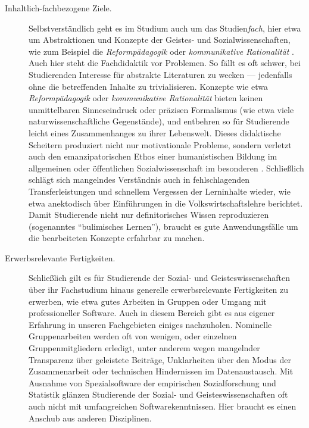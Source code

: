 \documentclass[11pt,a4paper,oneside]{article}
\begin{document}
\begin{description}
	\item[Inhaltlich-fachbezogene Ziele.]
		Selbstverständlich geht es im Studium auch um das Studien\emph{fach}, hier etwa um Abstraktionen und Konzepte der Geistes- und Sozialwissenschaften, wie zum Beispiel die \emph{Reformpädagogik} \cite{Freinet1979}
		oder \emph{kommunikative Rationalität} \cite{Habermas1988a}.
		Auch hier steht die Fachdidaktik vor Problemen.
		So fällt es oft schwer, bei Studierenden Interesse für abstrakte Literaturen zu wecken --- jedenfalls ohne die betreffenden Inhalte zu trivialisieren.
		Konzepte wie etwa \emph{Reformpädagogik} oder \emph{kommunikative Rationalität} bieten keinen unmittelbaren Sinneseindruck oder präzisen Formalismus (wie etwa viele naturwissenschaftliche Gegenstände), und entbehren so für Studierende leicht eines Zusammenhanges zu ihrer Lebenswelt.
		Dieses didaktische Scheitern produziert nicht nur motivationale Probleme, sondern verletzt auch den emanzipatorischen Ethos einer humanistischen Bildung im allgemeinen %
		oder öffentlichen Sozialwissenschaft im besonderen \cite{gans1989public-sociology}.
		Schließlich schlägt sich mangelndes Verständnis auch in fehlschlagenden Transferleistungen und schnellem Vergessen der Lerninhalte wieder, wie etwa \cite{Frank2007a} anektodisch über Einführungen in die Volkswirtschaftslehre berichtet.
		Damit Studierende nicht nur definitorisches Wissen reproduzieren (sogenanntes ``bulimisches Lernen''), braucht es gute Anwendungsfälle um die bearbeiteten Konzepte erfahrbar zu machen.
	\item[Erwerbsrelevante Fertigkeiten.]
		Schließlich gilt es für Studierende der Sozial- und Geisteswissenschaften über ihr Fachstudium hinaus generelle erwerbsrelevante Fertigkeiten zu erwerben, wie etwa gutes Arbeiten in Gruppen oder Umgang mit professioneller Software.
		Auch in diesem Bereich gibt es aus eigener Erfahrung in unseren Fachgebieten einiges nachzuholen.
		Nominelle Gruppenarbeiten werden oft von wenigen, oder einzelnen Gruppenmitgliedern erledigt, unter anderem wegen mangelnder Transparenz über geleistete Beiträge, Unklarheiten über den Modus der Zusammenarbeit oder technischen Hindernissen im Datenaustausch.
		Mit Ausnahme von Spezialsoftware der empirischen Sozialforschung und Statistik glänzen Studierende der Sozial- und Geisteswissenschaften oft auch nicht mit umfangreichen Softwarekenntnissen.
		Hier braucht es einen Anschub aus anderen Disziplinen.
\end{description}
\end{document}
